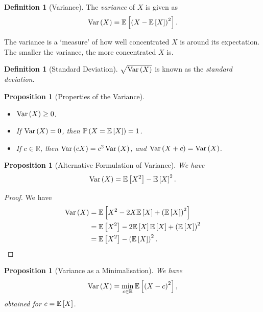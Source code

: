 \documentclass{article}
\newtheorem{proposition}[theorem]{Proposition}
\theoremstyle{definition}
\newtheorem{definition}[theorem]{Definition}
\theoremstyle{remark}
\newcommand{\RR}{\mathbb{R}}
\newcommand{\Prob}{\mathbb{P}}
\newcommand{\Expt}{\mathbb{E}}
\newcommand{\Var}{\operatorname{Var}}
\begin{document}
\begin{definition}[Variance]
    \label{def:variance}%
    The \emph{variance} of \(X\) is given as
    \[
        \Var\pqty{X} = \Expt\bqty{\pqty{X - \Expt\bqty{X}}^2}.
    \]
\end{definition}

The variance is a `measure' of how well concentrated \(X\) is around its expectation. The smaller the variance, the more concentrated \(X\) is.

\begin{definition}[Standard Deviation]
    \label{def:std-deviation}%
    \(\sqrt{\Var\pqty{X}}\) is known as the \emph{standard deviation}.
\end{definition}

\begin{proposition}[Properties of the Variance]
    \label{prop:properties-of-variance}%
    \begin{itemize}
        \item \(\Var\pqty{X} \geq 0\).
        \item If \(\Var\pqty{X} = 0\), then \(\Prob\pqty{X = \Expt\bqty{X}} = 1\).
        \item If \(c \in \RR\), then \(\Var\pqty{cX} = c^2 \Var\pqty{X}\), and \(\Var\pqty{X + c} = \Var\pqty{X}\).
    \end{itemize}
\end{proposition}

\begin{proposition}[Alternative Formulation of Variance]
    \label{prop:alt-formulation}%
    We have
    \[
        \Var\pqty{X} = \Expt\bqty{X^2} - \Expt\bqty{X}^2.
    \]
\end{proposition}

\begin{proof}
    We have
    \begin{align*}
        \Var\pqty{X} &= \Expt\bqty{X^2 - 2X \Expt\bqty{X} + \pqty{\Expt\bqty{X}}^2} \\
        &= \Expt\bqty{X^2} - 2 \Expt\bqty{X} \Expt\bqty{X} + \pqty{\Expt\bqty{X}}^2 \\
        &= \Expt\bqty{X^2} - \pqty{\Expt\bqty{X}}^2.
    \end{align*}
\end{proof}

\begin{proposition}[Variance as a Minimalisation]
    \label{prop:variance-minimalisation}%
    We have
    \[
        \Var\pqty{X} = \min_{c \in \RR} \Expt\bqty{\pqty{X - c}^2},
    \]
    obtained for \(c = \Expt\bqty{X}\).
\end{proposition}
\end{document}

